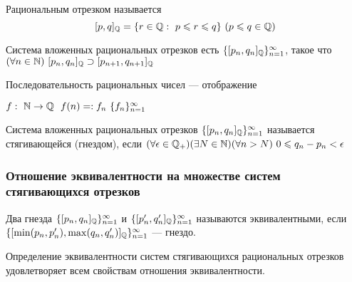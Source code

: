 \begin{definition}
    Рациональным отрезком называется
    \[[p, q]_{\mathbb{Q}} = \{r \in \mathbb{Q} :\ p \leqslant r \leqslant q\}
    \ (p \leqslant q \in \mathbb{Q})\]
\end{definition}

\begin{definition}
    Система вложенных рациональных отрезков есть
    $\{[p_n, q_n]_{\mathbb{Q}}\}_{n = 1}^{\infty}$, такое что
    $(\forall n \in \mathbb{N})\ [p_n, q_n]_{\mathbb{Q}} \supset
    [p_{n + 1}, q_{n + 1}]_{\mathbb{Q}}$
\end{definition}

\begin{definition}
    Последовательность рациональных чисел ---
    отображение 
    
    $f :\ \mathbb{N} \rightarrow \mathbb{Q}\ \ f(n)
    =: f_n \ \{f_n\}_{n = 1}^{\infty}$
\end{definition}

\begin{definition}
    Система вложенных рациональных отрезков
    $\{[p_n, q_n]_{\mathbb{Q}}\}_{n = 1}^{\infty}$ 
    называется стягивающейся (гнездом), если
    $(\forall \epsilon \in \mathbb{Q}_+)(\exists N \in \mathbb{N})
    (\forall n > N)\ 0 \leqslant q_n - p_n < \epsilon$
\end{definition}

\subsubsection*{Отношение эквивалентности на множестве
систем стягивающихся отрезков}

\begin{definition}
    Два гнезда $\{[p_n, q_n]_{\mathbb{Q}}\}_{n = 1}^{\infty}$ 
    и $\{[p_n', q_n']_{\mathbb{Q}}\}_{n = 1}^{\infty}$
    называются эквивалентными, если 
    $\{[\min (p_n, p_n'), \max (q_n, q_n')]
    _{\mathbb{Q}}\}_{n = 1}^{\infty}$ --- гнездо.
\end{definition}

\begin{proposition}
    Определение эквивалентности систем стягивающихся
    рациональных отрезков удовлетворяет всем свойствам
    отношения эквивалентности.
\end{proposition}

